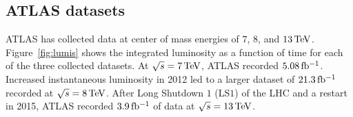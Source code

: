 \subsection{ATLAS datasets}

ATLAS has collected data at center of mass energies of $7$, $8$, and $13 \TeV$. Figure~\ref{fig:lumis} shows the integrated luminosity as a function of time for each of the three collected datasets. At $\sqrt{s} = 7 \TeV$, ATLAS recorded $5.08\mbox{\,fb$^{-1}$}$. Increased instantaneous luminosity in 2012 led to a larger dataset of $21.3 \mbox{\,fb$^{-1}$}$ recorded at $\sqrt{s} = 8 \TeV$. After Long Shutdown $1$ (LS$1$) of the LHC and a restart in 2015, ATLAS recorded $3.9\mbox{\,fb$^{-1}$}$ of data at $\sqrt{s} = 13 \TeV$. ~\cite{Lumi_Run1, Lumi_Run2} 

\begin{figure}[h!]
  \centering
  \captionsetup{justification=centering}


\end{figure}
